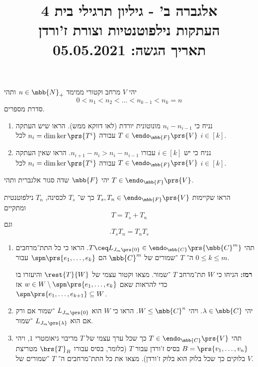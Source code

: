 \documentclass[a4paper,10pt,twoside,openany]{article}
\title{
אלגברה ב' - גיליון תרגילי בית 4 \\
העתקות נילפוטנטיות וצורת ז'ורדן
\\
\small{תאריך הגשה: 05.05.2021}
}
\date{}
\renewcommand{\emph}[1]{\textbf{#1}}
\begin{document}
\maketitle

\begin{exercise}%
יהי
$V$
מרחב וקטורי ממימד
$n \in \mbb{N}_+$
ותהי
\[0 < n_1 < n_2 < \ldots < n_{k-1} < n_k = n\]
סדרת מספרים.

\begin{enumerate}
\item נניח כי
$n_i - n_{i-1}$
מונוטונית יורדת (לאו דווקא ממש).
הראו שיש העתקה
$T \in \endo_{\mbb{F}}\prs{V}$
עבורה
$n_i = \dim\ker\prs{T^i}$
לכל
$i \in [k]$.

\item נניח כי יש
$i \in [k]$
עבורו
$n_{i+1} - n_i > n_i - n_{i-1}$.
הראו שאין העתקה
$T \in \endo_{\mbb{F}}\prs{V}$
עבורה
$n_i = \dim\ker\prs{T^i}$
לכל
$i \in [k]$.
\end{enumerate}
\end{exercise}

\begin{exercise}
יהי
$\mbb{F}$
שדה סגור אלגברית ותהי
$T \in \endo_{\mbb{F}}\prs{V}$.

 הראו שקיימות
$T_s,T_n \in \endo_{\mbb{F}}\prs{V}$
כך ש־%
$T_s$
לכסינה,
$T_n$
נילפוטנטית ומתקיים
\[T = T_s + T_n\]
וגם
\[\text{.} T_s T_n = T_n T_s\]
\end{exercise}

\begin{exercise}
\begin{enumerate}
\item תהי
$T \ceq L_{J_m\prs{0}} \in \endo_{\mbb{C}}\prs{\mbb{C}^m}$.
הראו כי כל התת־מרחבים ה־%
$T$%
־שמורים של
$\mbb{C}^m$
הם
$\spn\prs{e_1, \ldots, e_k}$
עבור
$0 \leq k \leq m$.

\emph{רמז:}
הניחו כי
$W$
תת־מרחב
$T$%
־שמור. מצאו וקטור עצמי של $\rest{T}{W}$ והיעזרו בו כדי להראות שאם
$w \in W \setminus \spn\prs{e_1, \ldots, e_k}$
אז
$\spn\prs{e_1, \ldots, e_{k+1}} \subseteq W$.

\item יהי
$\lambda \in \mbb{C}$.
ויהי
$W \leq \mbb{C}^n$.
הראו כי
$W$
הוא
$L_{J_m\prs{0}}$%
־שמור אם ורק אם הוא
$L_{J_m\prs{\lambda}}$%
־שמור.

\item תהי
$T \in \endo_{\mbb{C}}\prs{V}$
כך שכל ערך עצמי של
$T$
מריבוי גיאומטרי
$1$,
ויהי
$B = \prs{v_1, \ldots, v_n}$
בסיס ז'ורדן עבור
$T$
(כלומר, בסיס עבורו
$\brs{T}_B$
מטריצת בלוקים כך שכל בלוק הוא בלוק ז'ורדן).
מצאו את כל התת־מרחבים ה־%
$T$%
־שמורים של
$V$.
\end{enumerate}
\end{exercise}
\end{document}
